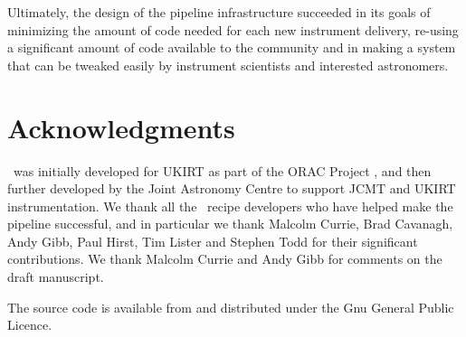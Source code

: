 \documentclass[final,authoryear,5p,times,twocolumn]{elsarticle}
\begin{document}
Ultimately, the design of the pipeline infrastructure succeeded in its
goals of minimizing the amount of code needed for each new instrument
delivery, re-using a significant amount of code available to the
community and in making a system that can be tweaked easily by
instrument scientists and interested astronomers.


\section*{Acknowledgments}

\oracdr\ was initially developed for UKIRT as part of the ORAC Project
\citep{1998SPIE.3349..184B}, and then further developed by the Joint
Astronomy Centre to support JCMT and UKIRT instrumentation. We thank
all the \oracdr\ recipe developers who have helped make the pipeline
successful, and in particular we thank  Malcolm Currie, Brad Cavanagh,
Andy Gibb, Paul Hirst,  Tim Lister and Stephen Todd for their
significant contributions. We thank Malcolm Currie and Andy Gibb for
comments on the draft manuscript.

The source
code is available from
and distributed under the Gnu General Public Licence.

\end{document}
